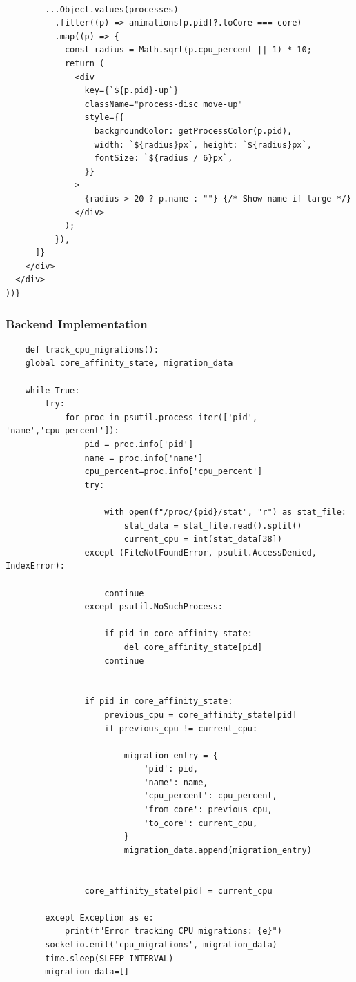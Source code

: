 \documentclass[12pt]{article}
\begin{document}
\begin{enumerate}
\begin{verbatim}
        
        ...Object.values(processes)
          .filter((p) => animations[p.pid]?.toCore === core)
          .map((p) => {
            const radius = Math.sqrt(p.cpu_percent || 1) * 10;
            return (
              <div
                key={`${p.pid}-up`}
                className="process-disc move-up"
                style={{
                  backgroundColor: getProcessColor(p.pid), 
                  width: `${radius}px`, height: `${radius}px`, 
                  fontSize: `${radius / 6}px`, 
                }}
              >
                {radius > 20 ? p.name : ""} {/* Show name if large */}
              </div>
            );
          }),
      ]}
    </div>
  </div>
))}

\end{verbatim}
\end{enumerate}
\subsubsection{Backend Implementation}
\begin{verbatim}
    def track_cpu_migrations():
    global core_affinity_state, migration_data

    while True:
        try:
            for proc in psutil.process_iter(['pid', 'name','cpu_percent']):
                pid = proc.info['pid']
                name = proc.info['name']
                cpu_percent=proc.info['cpu_percent']
                try:
                    
                    with open(f"/proc/{pid}/stat", "r") as stat_file:
                        stat_data = stat_file.read().split()
                        current_cpu = int(stat_data[38]) 
                except (FileNotFoundError, psutil.AccessDenied, IndexError):
                   
                    continue
                except psutil.NoSuchProcess:
                    
                    if pid in core_affinity_state:
                        del core_affinity_state[pid]
                    continue

                
                if pid in core_affinity_state:
                    previous_cpu = core_affinity_state[pid]
                    if previous_cpu != current_cpu:
                       
                        migration_entry = {
                            'pid': pid,
                            'name': name,
                            'cpu_percent': cpu_percent,
                            'from_core': previous_cpu,
                            'to_core': current_cpu,
                        }
                        migration_data.append(migration_entry)

                
                core_affinity_state[pid] = current_cpu

        except Exception as e:
            print(f"Error tracking CPU migrations: {e}")
        socketio.emit('cpu_migrations', migration_data) 
        time.sleep(SLEEP_INTERVAL) 
        migration_data=[]
\end{verbatim}
\end{document}
